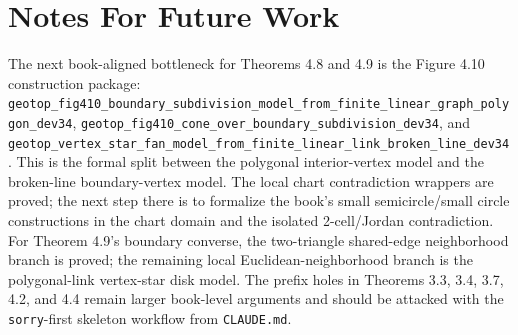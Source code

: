 \documentclass{article}
\begin{document}
\section*{Notes For Future Work}

The next book-aligned bottleneck for Theorems 4.8 and 4.9 is the Figure 4.10
construction package:
\texttt{geotop\_fig410\_boundary\_subdivision\_model\_from\_finite\_linear\_graph\_polygon\_dev34},
\texttt{geotop\_fig410\_cone\_over\_boundary\_subdivision\_dev34},
and
\texttt{geotop\_vertex\_star\_fan\_model\_from\_finite\_linear\_link\_broken\_line\_dev34}.
This is the formal split between the polygonal interior-vertex model and the
broken-line boundary-vertex model. The local chart contradiction wrappers are
proved; the next
step there is to formalize the book's small semicircle/small circle
constructions in the chart domain and the isolated 2-cell/Jordan contradiction.
For Theorem 4.9's boundary converse, the two-triangle shared-edge neighborhood
branch is proved; the remaining local Euclidean-neighborhood branch is the
polygonal-link vertex-star disk model. The prefix
holes in Theorems 3.3, 3.4, 3.7, 4.2, and 4.4 remain larger book-level
arguments and should be attacked with the \texttt{sorry}-first skeleton
workflow from \texttt{CLAUDE.md}.
\end{document}
